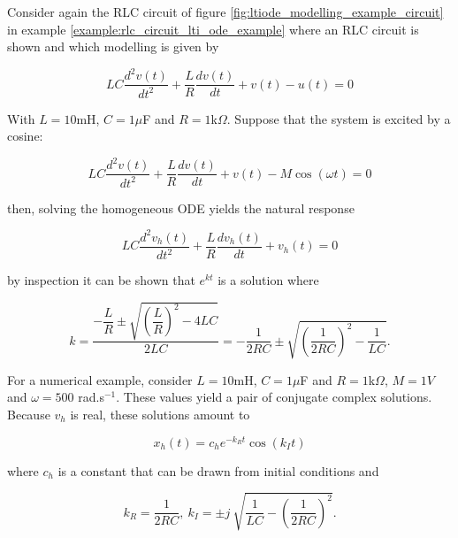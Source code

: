 \begin{example}\label{example:rlc_circuit_natural_example} %
	Consider again the RLC circuit of figure \ref{fig:ltiode_modelling_example_circuit} in example \ref{example:rlc_circuit_lti_ode_example} where an RLC circuit is shown and which modelling is given by

\begin{equation} LC\dfrac{d^2v(t)}{dt^2} + \dfrac{L}{R}\dfrac{dv(t)}{dt} + v(t) - u(t) = 0 \end{equation}

	With $L = 10$mH, $C = 1\mu$F and $R = 1$k$\Omega$. Suppose that the system is excited by a cosine:

\begin{equation} LC\dfrac{d^2v(t)}{dt^2} + \dfrac{L}{R}\dfrac{dv(t)}{dt} + v(t) - M\cos\left(\omega t\right) = 0 \label{eq:example2_original_ode}\end{equation}

	\noindent then, solving the homogeneous ODE yields the natural response

\begin{equation} LC\dfrac{d^2v_h(t)}{dt^2} + \dfrac{L}{R}\dfrac{dv_h(t)}{dt} + v_h(t) = 0 \end{equation}

	\noindent by inspection it can be shown that $e^{kt}$ is a solution where

\begin{equation} k = \dfrac{-\dfrac{L}{R} \pm \sqrt{\left(\dfrac{L}{R}\right)^2 - 4LC} }{2LC} = -\dfrac{1}{2RC} \pm \sqrt{\left(\dfrac{1}{2RC}\right)^2 - \dfrac{1}{LC}} .\end{equation}

	For a numerical example, consider $L = 10$mH, $C = 1\mu$F and $R = 1$k$\Omega$, $M = 1V$ and $\omega = 500$ rad.s$^{-1}$. These values yield a pair of conjugate complex solutions. Because $v_h$ is real, these solutions amount to

\begin{equation} x_h(t) = c_he^{-k_R t} \cos\left(k_I t\right) \label{example:rlc_circuit_natural_example_homogeneous} \end{equation}

	\noindent where $c_h$ is a constant that can be drawn from initial conditions and

\begin{equation} k_R = \dfrac{1}{2RC},\ k_I = \pm j\ \sqrt{\dfrac{1}{LC} - \left(\dfrac{1}{2RC}\right)^2} .\end{equation}


\end{example}
